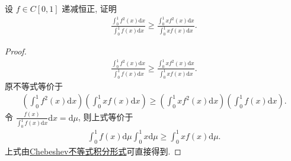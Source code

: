 \documentclass[../../main.tex]{subfiles}%
\begin{document}
\begin{example}
设 $f \in C[0,1]$ 递减恒正, 证明
\begin{align*}
\frac{\int_0^1 f^2(x)\mathrm{d}x}{\int_0^1 f(x)\mathrm{d}x} \geqslant \frac{\int_0^1 xf^2(x)\mathrm{d}x}{\int_0^1 xf(x)\mathrm{d}x}.
\end{align*}
\end{example}
\begin{proof}

\begin{align*}
\frac{\int_0^1 f^2(x)\mathrm{d}x}{\int_0^1 f(x)\mathrm{d}x} \geqslant \frac{\int_0^1 xf^2(x)\mathrm{d}x}{\int_0^1 xf(x)\mathrm{d}x}.
\end{align*}
原不等式等价于
\begin{align*}
\left(\int_0^1 f^2(x)\mathrm{d}x\right)\left(\int_0^1 xf(x)\mathrm{d}x\right) \geqslant \left(\int_0^1 xf^2(x)\mathrm{d}x\right)\left(\int_0^1 f(x)\mathrm{d}x\right).
\end{align*}
令 $\frac{f(x)}{\int_0^1 f(x)\mathrm{d}x}\mathrm{d}x = \mathrm{d}\mu$, 则上式等价于
\begin{align*}
\int_0^1 f(x)\mathrm{d}\mu \int_0^1 x\mathrm{d}\mu \geqslant \int_0^1 xf(x)\mathrm{d}\mu.
\end{align*}
上式由\hyperref[Chebeshev不等式积分形式]{Chebeshev不等式积分形式}可直接得到. 

\end{proof}
\end{document}
